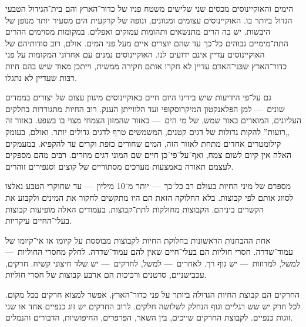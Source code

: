 
הימים והאוקיינוסים מכסים שני שלישים משטח פניו של כדור־הארץ והם בית־הגידול הטבעי הגדול ביותר בו. האוקיינוסים עצומים ומגוונים, ונופה של קרקעית הים מסעיר יותר מנופן של היבּשות. יש בה הרים מתנשׂאים ותהומות עמוקים ואפלים. במקומות מסוימים ההרים התת־מימיים גבוהים כל־כך עד שהם יוצרים איים מעל פני המים. אולם, רוב סודותיהם של האוקיינוסים עדיין אינם ידועים לנו. האוקיינוסים נמנים עם אחרוני המקומות על פני כדור־הארץ שבּני־האדם עדיין לא חקרו אותם חקירה ממשית, וייתכן מאוד שיש בהם חיות רבּות שעדיין לא נתגלו.

גם על־פי הידיעות שיש בידינו היום חיים באוקיינוסים מיגוון עצום של יצורים בממדים שונים~— למן הפּלאנקטון המיקרוסקופּי ועד הלווייתן הענק. רוב החיות מתגוררות בחלקים העליונים, המוארים באור שמש, של מי הים~— באזור שהמזון הצמחי מצוי בו בשפע. באזור זה „רועות” להקות גדולות של דגים קטנים, המשמשים טרף לדגים גדולים יותר. ואולם, בעומק קילומטרים אחדים מתחת לאזור הזה, המים שחורים כזפת וקרים עד להקפּיא. במעמקים האלה אין קיום לשום צמח, ואף־על־פי־כן חיים שם המוני דגים מוזרים. רבּים מהם מספּקים לעצמם תאורה באמצעות מערכים מסתוריים של קוצים וסנפּירים זוהרים.




מספּרם של מיני החיות בעולם רב כל־כך~— יותר מ־10 מיליון~— עד שחוקרי הטבע נאלצו לסווג אותם לפי קבוצות. בלא החלוקה הזאת הם היו מתקשים לחקור את המינים ולקבּוע את הקשרים ביניהם.   הקבוצות מחולקות לתת־קבוצות. בעמודים האלה מופיעות  קבוצות בעלי־החיים עיקריות.



אחת ההבחנות הראשונות בחלוקת החיות לקבוצות מבוססת על קיומו או אי־קיומו של עמוד־שדרה. חסרי חוליות הם בעלי־חיים שאין להם עמוד־שדרה. לחלק מחסרי החוליות~— למשל, למדוזות~— יש גוף רך. לאחרים~— למשל, לחרקים~— יש שלד חיצוני קשיח. חרקים, עכּבישניים, סרטנים ורכּיכות הם ארבּע קבוצות של חסרי חוליות.



החרקים הם קבוצת החיות הגדולה ביותר על פני כדור־הארץ. אפשר למצוא חרקים בכל מקום. לכל חרק יש שש רגליים וגוף הנחלק לשלושה חלקים. לרוב החרקים יש זוג כנפיים אחד או שני זוגות כנפיים. לקבוצת החרקים שייכים, בין השאר, הפּרפּרים, החיפּושיות, הדבורים והנמלים.



